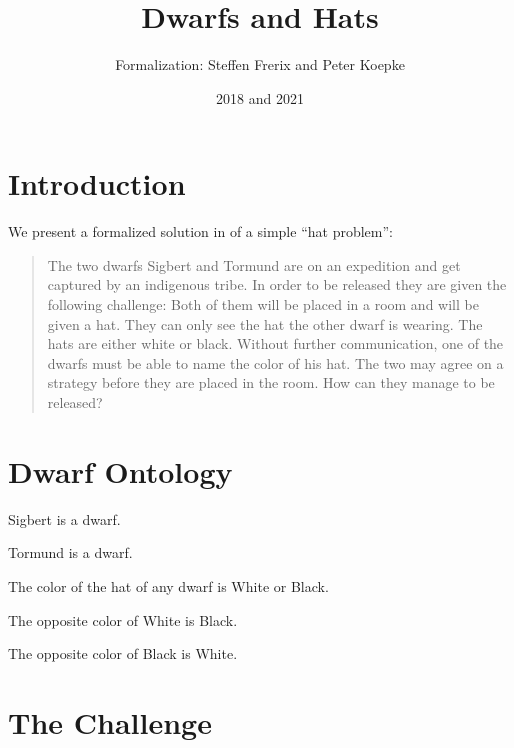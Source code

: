 \documentclass{stex}
\title{Dwarfs and Hats}
\author{\Naproche Formalization: Steffen Frerix and Peter Koepke}
\date{2018 and 2021}
\begin{document}
\maketitle

\section{Introduction}

We present a formalized solution in \Naproche of a simple “hat problem”:

\begin{quotation}
  \noindent The two dwarfs Sigbert and Tormund are on an expedition and get captured by an indigenous tribe.
  In order to be released they are given the following challenge:
  Both of them will be placed in a room and will be given a hat.
  They can only see the hat the other dwarf is wearing.
  The hats are either white or black.
  Without further communication, one of the dwarfs must be able to name the color of his hat.
  The two may agree on a strategy before they are placed in the room.
  How can they manage to be released?
\end{quotation}


\section{Dwarf Ontology}


\begin{forthel}
  \begin{signature}
    Sigbert is a dwarf.
  \end{signature}
  \begin{signature}
    Tormund is a dwarf.
  \end{signature}
  \begin{axiom}
    The color of the hat of any dwarf is White or Black.
  \end{axiom}
  \begin{axiom}
    The opposite color of White is Black.
  \end{axiom}
  \begin{axiom}
    The opposite color of Black is White.
  \end{axiom}
\end{forthel}


\section{The Challenge}
\end{document}
